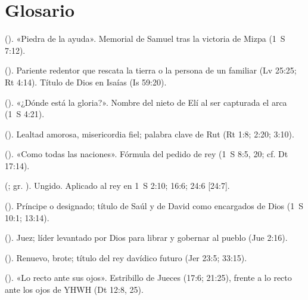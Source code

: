 \section*{Glosario}
\begin{description}\small
\item[Eben-ezer] (). «Piedra de la ayuda». Memorial de Samuel tras la victoria de Mizpa (1~S 7:12).
\item[Go'el] (). Pariente redentor que rescata la tierra o la persona de un familiar (Lv 25:25; Rt 4:14). Título de Dios en Isaías (Is 59:20).
\item[Icabod] (). «¿Dónde está la gloria?». Nombre del nieto de Elí al ser capturada el arca (1~S 4:21).
\item[Jésed] (). Lealtad amorosa, misericordia fiel; palabra clave de Rut (Rt 1:8; 2:20; 3:10).
\item[Kejol ha-goyim] (). «Como todas las naciones». Fórmula del pedido de rey (1~S 8:5, 20; cf. Dt 17:14).
\item[Mashíaj] (; gr. ). Ungido. Aplicado al rey en 1~S 2:10; 16:6; 24:6 [24:7].
\item[Naguid] (). Príncipe o designado; título de Saúl y de David como encargados de Dios (1~S 10:1; 13:14).
\item[Shofet] (). Juez; líder levantado por Dios para librar y gobernar al pueblo (Jue 2:16).
\item[Tsémaj] (). Renuevo, brote; título del rey davídico futuro (Jer 23:5; 33:15).
\item[Yashar be-einav] (). «Lo recto ante sus ojos». Estribillo de Jueces (17:6; 21:25), frente a lo recto ante los ojos de YHWH (Dt 12:8, 25).
\end{description}


